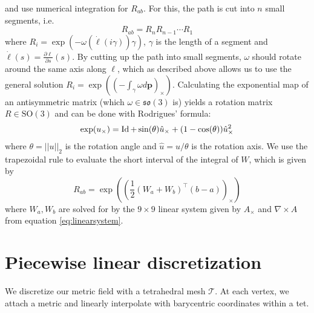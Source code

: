 \documentclass[../thesis.tex]{subfiles}
\begin{document}
and use numerical integration for $R_{ab}$. For this, the path is cut into $n$ small segments, i.e.
$$R_{ab}= R_nR_{n-1} \dotsb R_1$$
where $R_i = \exp(-\omega (\dot{\ell}(i\gamma))\gamma)$, $\gamma$ is the length of a segment and $\dot{\ell}(s)=\frac{\partial \ell}{\partial s}(s)$.
By cutting up the path into small segments, $\omega$ should rotate around the same axis along $\ell$, which as described above
allows us to use the general solution $R_{i}=\exp((-\int_{\gamma} \omega d\bm{p})_{\times})$.
Calculating the exponential map of an antisymmetric matrix (which $\omega \in \mathfrak{so}(3)$ is) yields a
rotation matrix $R\in \mathrm{SO}(3)$ and can be done with Rodrigues' formula:
$$\exp(u_{\times}) = \operatorname{Id} + \sin(\theta) \hat{u}_{\times} + (1-\cos(\theta)) \hat{u}_{\times}^2$$
where $\theta = ||u||_2$ is the rotation angle and $\hat{u}= u/\theta$ is the rotation axis.
We use the trapezoidal rule to evaluate the short interval of the integral of $W$, which is given by
$$R_{ab}=\exp \left( \left(\frac{1}{2}(W_a + W_b)^{\top}(b-a)\right)_{\times}\right)$$
where $W_a, W_b$ are solved for by the $9\times9$ linear system given by $A_{\times}$ and $\nabla \times A$ from equation \ref{eq:linearsystem}.


\section{Piecewise linear discretization}
We discretize our metric field with a tetrahedral mesh $\mathcal{T}$.
At each vertex, we attach a metric and linearly interpolate with barycentric coordinates within a tet.
\end{document}

